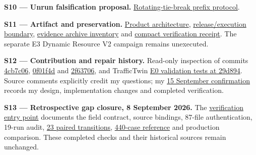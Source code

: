 \documentclass[12pt,a4paper]{article}
\begin{document}
\label{source-s10}

\textbf{S10 --- Unrun falsification proposal.} \href{\detokenize{../../evaluation/common_target_mechanism_audit_2026-09-07/TIEBREAK_PREFIX_PROPOSAL.md}}{Rotating-tie-break prefix protocol}.

\label{source-s11}

\textbf{S11 --- Artifact and preservation.} \href{\detokenize{../../architecture_current_release.md}}{Product architecture}, \href{\detokenize{../../quality/final_release_status_20260815.md}}{release/execution boundary}, \href{\detokenize{../../evaluation/vec_followup_2026-09-07/ARCHIVE_INVENTORY.json}}{evidence archive inventory} and \href{\detokenize{../../evaluation/vec_followup_2026-09-07/COMPACT_VERIFICATION.json}}{compact verification receipt}. The separate E3 Dynamic Resource V2 campaign remains unexecuted.

\label{source-s12}

\textbf{S12 --- Contribution and repair history.} Read-only inspection of  commits \href{\detokenize{https://github.com/Abdulla4akash/vec_env/commit/4cb7c06aab1b455d68f71ea9143172463784dea9}}{4cb7c06}, \href{\detokenize{https://github.com/Abdulla4akash/vec_env/commit/0f01f4d2082d3e8b735e74a873095ab8eeba37cc}}{0f01f4d} and \href{\detokenize{https://github.com/Abdulla4akash/vec_env/commit/2f63706f46319433a2ba3af1df97afd0e56a95d1}}{2f63706}, and TrafficTwin \href{\detokenize{https://github.com/Abdulla4akash/traffictwin/blob/29d8945862b7df1bd5d7879ba1d980a388f6be0d/tests/test_validate_e0_smoke.py}}{E0 validation tests at 29d894}. Source comments explicitly credit my questions; my \href{\detokenize{AUTHOR_ACTIONS.md}}{15 September confirmation} records my design, implementation changes and completed verification.

\label{source-s13}

\textbf{S13 --- Retrospective gap closure, 8 September 2026.} The \href{\detokenize{../gap_closure_2026-09-08/verification/README.md}}{verification entry point} documents the field contract, source bindings, 87-file authentication, 19-run audit, \href{\detokenize{../gap_closure_2026-09-08/verification/results/OUTCOME_TRANSITIONS.json}}{23 paired transitions}, \href{\detokenize{../gap_closure_2026-09-08/verification/results/KERNEL_RESULTS.json}}{440-case reference} and production comparison. These completed checks and their historical sources remain unchanged.
\end{document}
